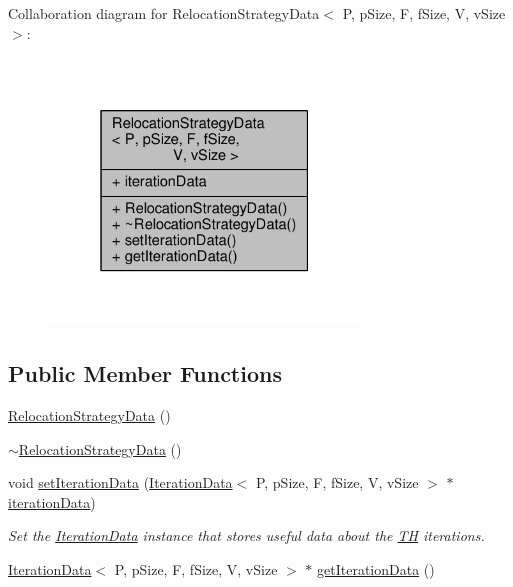 Collaboration diagram for Relocation\+Strategy\+Data$<$ P, p\+Size, F, f\+Size, V, v\+Size $>$\+:
\nopagebreak
\begin{figure}[H]
\begin{center}
\leavevmode
\includegraphics[width=235pt]{structRelocationStrategyData__coll__graph}
\end{center}
\end{figure}
\subsection*{Public Member Functions}
\begin{DoxyCompactItemize}
\item 
\hyperlink{structRelocationStrategyData_a71fd536ba8c523a79caf20c688f04951}{Relocation\+Strategy\+Data} ()
\item 
\hyperlink{structRelocationStrategyData_a59cbaaf8cc4b655bfed790e90d5ededa}{$\sim$\+Relocation\+Strategy\+Data} ()
\item 
void \hyperlink{structRelocationStrategyData_ac22ab7079cd4bc194d2a1143ce0766ae}{set\+Iteration\+Data} (\hyperlink{structIterationData}{Iteration\+Data}$<$ P, p\+Size, F, f\+Size, V, v\+Size $>$ $\ast$\hyperlink{structRelocationStrategyData_adacdd9bfa31c367ca0c5ac82b8d1d2e5}{iteration\+Data})
\begin{DoxyCompactList}\small\item\em Set the \hyperlink{structIterationData}{Iteration\+Data} instance that stores useful data about the \hyperlink{classTH}{TH} iterations. \end{DoxyCompactList}\item 
\hyperlink{structIterationData}{Iteration\+Data}$<$ P, p\+Size, F, f\+Size, V, v\+Size $>$ $\ast$ \hyperlink{structRelocationStrategyData_af0c8811e45456b184467bb9c499fa8d9}{get\+Iteration\+Data} ()
\end{DoxyCompactItemize}
